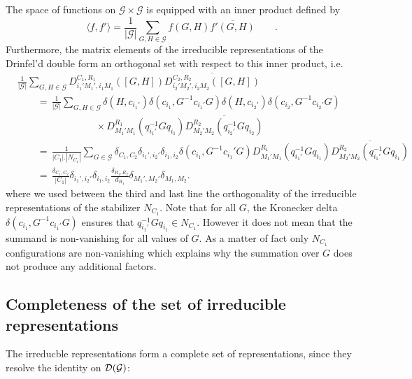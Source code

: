 \documentclass[nofootinbib,superscriptaddress,eqsecnum,tightenlines,11pt]{revtex4-1}
\def\nn{\nonumber}
\def\q{\qquad}
\def\mG{\mathcal{G}}
\def\be{\begin{equation}}
\def\ee{\end{equation}}
\begin{document}
The space of functions on $\mG \times \mG$ is equipped with an inner product defined by
\be
	\langle f, f' \rangle = \frac{1}{|\mG|}\sum_{G,H \in \mG}f(G,H)\overline{f'(G,H)} \q.
\ee
Furthermore, the matrix elements of the  irreducible representations of the Drinfel'd double form an orthogonal set with respect to this inner product, i.e.
\begin{align}
	&\frac{1}{|\mathcal{G}|}\sum_{G,H \in \mathcal{G}}D^{C_1,R_1}_{i_1'M_1',i_1M_1}( [G,H])\overline{D^{C_2,R_2}_{i_2'M_2',i_2M_2}( [G,H])} \\ \nn
	&\q =\, \frac{1}{|\mathcal{G}|}\sum_{G,H \in \mathcal{G}}\delta(H,c_{i_1'})\delta(c_{i_1},G^{-1}c_{i_1'}G)\delta(H,c_{i_2'})\delta(c_{i_2},G^{-1}c_{i_2'}G)
	\\ \nn
	& \q \q \q \q \times D^{R_1}_{M_1'M_1}(q_{i_1'}^{-1}Gq_{i_1})\overline{D^{R_2}_{M_2'M_2}(q_{i_2'}^{-1}Gq_{i_2})} \\	\nn
	&\q = \, \frac{1}{|C_1|.|N_{C_1}|}\sum_{G \in \mathcal{G}}\delta_{C_1,C_2} \delta_{i_1',i_2'}\delta_{i_1,i_2}\delta(c_{i_1},G^{-1}c_{i_1}'G)
	D^{R_1}_{M_1'M_1}(q_{i_1'}^{-1}Gq_{i_1})\overline{D^{R_2}_{M_2'M_2}(q_{i_1'}^{-1}Gq_{i_1})} \\	
	& \q = \, \frac{\delta_{C_1,C_2}}{|C_1|}\delta_{i_1',i_2'}\delta_{i_1,i_2}\frac{\delta_{R_1,R_2}}{d_{R_1}}\delta_{M_1',M_2'}\delta_{M_1,M_2}. 
\end{align}
where we used between the third and last line the orthogonality of the irreducible representations of the stabilizer $N_{C_1}$. Note that for all $G$, the Kronecker delta $\delta(c_{i_1},G^{-1}c_{i_1'}G)$ ensures that $q_{i_1'}^{-1}Gq_{i_1} \in N_{C_1}$. However it does not mean that the summand is non-vanishing for all values of $G$. As a matter of fact only $N_{C_1}$ configurations are non-vanishing which explains why the summation over $G$ does not produce any additional factors.

\subsection{Completeness of the set of irreducible representations}
The irreducble representations form a complete set of representations, since they resolve the identity on ${\cal D}({\cal G})$:
\end{document}
